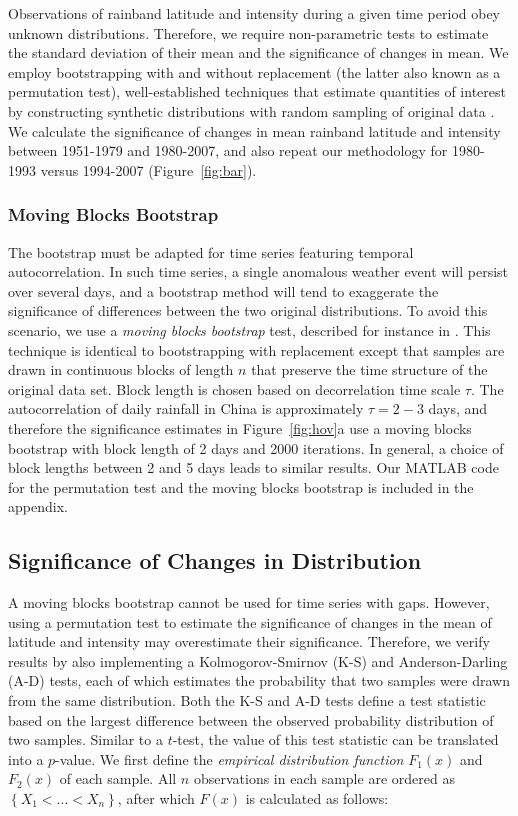 \documentclass[singlecolumn,11pt]{pnas-new}
\begin{document}
	Observations of rainband latitude and intensity during a given time period obey unknown distributions. Therefore, we require non-parametric tests to estimate the standard deviation of their mean and the significance of changes in mean. We employ bootstrapping with and without replacement (the latter also known as a permutation test), well-established techniques that estimate quantities of interest by constructing synthetic distributions with random sampling of original data \citep{Good2005}. We calculate the significance of changes in mean rainband latitude and intensity between 1951-1979 and 1980-2007, and also repeat our methodology for 1980-1993 versus 1994-2007 (Figure~\ref{fig:bar}).

\subsubsection{Moving Blocks Bootstrap}	
	
	The bootstrap must be adapted for time series featuring temporal autocorrelation. In such time series, a single anomalous weather event will persist over several days, and a bootstrap method will tend to exaggerate the significance of differences between the two original distributions. To avoid this scenario, we use a \textit{moving blocks bootstrap} test, described for instance in \citet{Singh2014}. This technique is identical to bootstrapping with replacement except that samples are drawn in continuous blocks of length $n$ that preserve the time structure of the original data set. Block length is chosen based on decorrelation time scale $\tau$. The autocorrelation of daily rainfall in China is approximately $\tau =2-3$ days, and therefore the significance estimates in Figure~\ref{fig:hov}a use a moving blocks bootstrap with block length of 2 days and 2000 iterations. In general, a choice of block lengths between 2 and 5 days leads to similar results. Our MATLAB code for the permutation test and the moving blocks bootstrap is included in the appendix.
	
\subsection{Significance of Changes in Distribution}

	A moving blocks bootstrap cannot be used for time series with gaps. However, using a permutation test to estimate the significance of changes in the mean of latitude and intensity may overestimate their significance. Therefore, we verify results by also implementing a Kolmogorov-Smirnov (K-S) and Anderson-Darling (A-D) tests, each of which estimates the probability that two samples were drawn from the same distribution. Both the K-S and A-D tests define a test statistic based on the largest difference between the observed probability distribution of two samples. Similar to a $t$-test, the value of this test statistic can be translated into a $p$-value. We first define the \textit{empirical distribution function} $F_1(x)$ and $F_2(x)$ of each sample. All $n$ observations in each sample are ordered as $\left\{X_1 < ... < X_n\right\}$, after which $F(x)$ is calculated as follows:
\end{document}
